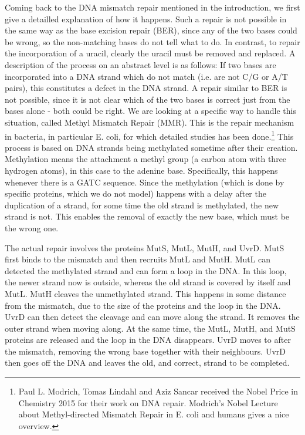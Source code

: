 Coming back to the DNA mismatch repair mentioned in the introduction, we first give a detailled explanation of how it happens. Such a repair is not possible in the same way as the base excision repair (BER), since any of the two bases could be wrong, so the non-matching  bases do not tell what to do. In contrast, to repair the incorporation of a uracil, clearly the uracil must be removed and replaced. A description of the process on an abstract level is as follows: If two bases are incorporated into a DNA strand which do not match (i.e. are not C/G or A/T pairs), this constitutes a defect in the DNA strand. A repair similar to BER is not possible, since it is not clear which of the two bases is correct just from the bases alone - both could be right. We are looking at a specific way to handle this situation, called Methyl Mismatch Repair (MMR). This is the repair mechanism in bacteria, in particular E. coli, for which detailed studies has been done.\footnote{Paul L. Modrich, Tomas Lindahl and Aziz Sancar received the Nobel Price in Chemistry 2015 for their work on DNA repair. Modrich's Nobel Lecture about Methyl-directed Mismatch Repair in E. coli and humans \cite{pmid27198632} gives a nice overview.} This process is based on DNA strands being methylated sometime after their creation. Methylation means the attachment a methyl group (a carbon atom with three hydrogen atoms), in this case to the adenine base. Specifically, this happens whenever there is a GATC sequence. Since the methylation (which is done by specific proteins, which we do not model) happens with a delay after the duplication of a strand, for some time the old strand is methylated, the new strand is not. This enables the removal of exactly the new base, which must be the wrong one.

The actual repair involves the proteins MutS, MutL, MutH, and UvrD. MutS first binds to the mismatch and then recruits MutL and MutH. MutL can detected the methylated strand and can form a loop in the DNA. In this loop, the newer strand now is outside, whereas the old strand is covered by itself and MutL. MutH cleaves the unmethylated strand. This happens in some distance from the mismatch, due to the size of the proteins and the loop in the DNA. UvrD can then detect the cleavage and can move along the strand. It removes the outer strand when moving along. At the same time, the MutL, MutH, and MutS proteins are released and the loop in the DNA disappears. UvrD moves to after the mismatch, removing the wrong base together with their neighbours. UvrD then goes off the DNA and leaves the old, and correct, strand to be completed. 

